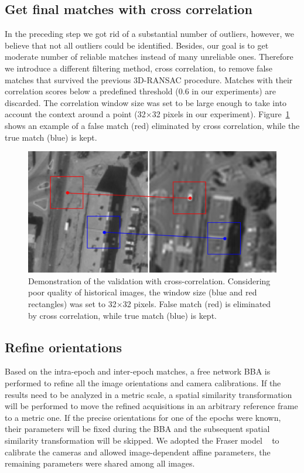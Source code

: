 \subsection{Get final matches with cross correlation}
In the preceding step we got rid of a substantial number of outliers, however, we believe that not all outliers could be identified. 
Besides, our goal is to get moderate number of reliable matches instead of many unreliable ones. Therefore we introduce a different filtering method, cross correlation, to remove false matches that survived the previous 3D-RANSAC procedure. 
Matches with their correlation scores below a predefined threshold (0.6 in our experiments) are discarded. The correlation window size was set to be large enough to take into account the context around a point (32$\times$32 pixels in our experiment). Figure~\ref{crossc} shows an example of a false match (red) eliminated by cross correlation, while the true match (blue) is kept.
\begin{figure}[htbp]
	\begin{center}
		\includegraphics[width=0.8\columnwidth]{images/Chapitre4/tiept.png}
		\caption{Demonstration of the validation with cross-correlation. Considering poor quality of historical images, the window size (blue and red rectangles) was set to 32$\times$32 pixels. False match (red) is eliminated by cross correlation, while true match (blue) is kept.}
		\label{crossc}
	\end{center}
\end{figure}

\subsection{Refine orientations}
Based on the intra-epoch and inter-epoch matches, a free network \ac{BBA} is performed to refine all the image orientations and camera calibrations. If the results need to be analyzed in a metric scale, a spatial similarity transformation will be performed to move the refined acquisitions in an arbitrary reference frame to a metric one. If the precise orientations for one of the epochs were known, their parameters will be fixed during the \ac{BBA} and the subsequent spatial similarity transformation will be skipped.
We adopted the Fraser model ~\cite{fraser1997digital} to calibrate the cameras and allowed image-dependent affine parameters, the remaining parameters were shared among all images.


